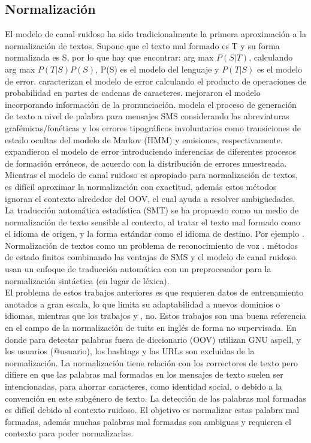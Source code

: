 \documentclass[spanish,12pt, a4paper,twoside]{paper}
\begin{document}
\subsection{Normalización}\label{sec:normalizacion}
El modelo de canal ruidoso \cite{shannon:1948} ha sido tradicionalmente la primera aproximación a la normalización de textos. Supone que el texto mal formado es T y su forma normalizada es S, por lo que hay que encontrar: arg max $P(S|T)$, calculando arg max $P(T|S) P(S)$, P(S) es el modelo del lenguaje y $P(T|S)$ es el modelo de error. \cite{brillmoore:2000} caracterizan el modelo de error calculando el producto de operaciones de probabilidad en partes de cadenas de caracteres. \cite{toutanovamoore:2002} mejoraron el modelo incorporando información de la pronunciación. \cite{choudhury:2007} modela el proceso de generación de texto a nivel de palabra para mensajes SMS considerando las abreviaturas grafémicas/fonéticas y los errores tipográficos involuntarios como transiciones de estado ocultas del modelo de Markov (HMM) y emisiones, respectivamente. \cite{cookstevenson:2009} expandieron el modelo de error introduciendo inferencias de diferentes procesos de formación erróneos, de acuerdo con la distribución de errores muestreada.\\

Mientras el modelo de canal ruidoso es apropiado para normalización de textos, es difícil aproximar la normalización con exactitud, además estos métodos ignoran el contexto alrededor del OOV, el cual ayuda a resolver ambigüedades. La traducción automática estadística (SMT) se ha propuesto como un medio de normalización de texto sensible al contexto, al tratar el texto mal formado como el idioma de origen, y la forma estándar como el idioma de destino. Por ejemplo \cite{aw:2006}. Normalización de textos como un problema de reconocimiento de voz \cite{kobus:2008}. \cite{beaufort:2002} métodos de estado finitos combinando las ventajas de SMS y el modelo de canal ruidoso. \cite{kaufmannkalita:2010} usan un enfoque de traducción automática con un preprocesador para la normalización sintáctica (en lugar de léxica).\\

El problema de estos trabajos anteriores es que requieren datos de entrenamiento anotados a gran escala, lo que limita su adaptabilidad a nuevos dominios o idiomas, mientras que los trabajos \cite{whitelaw:2009} y \cite{baldwin:2011}, no. Estos trabajos son una buena referencia en el campo de la normalización de tuits en inglés de forma no supervisada. En donde para detectar palabras fuera de diccionario (OOV) utilizan GNU aspell, y los usuarios (@usuario), los hashtags y las URLs son excluidas de la normalización. La normalización tiene relación con los correctores de texto \cite{peterson:1980} pero difiere en que las palabras mal formadas en los mensajes de texto suelen ser intencionadas, para ahorrar caracteres, como identidad social, o debido a la convención en este subgénero de texto. La detección de las palabras mal formadas es difícil debido al contexto ruidoso. El objetivo es normalizar estas palabra mal formadas, además muchas palabras mal formadas son ambiguas y requieren el contexto para poder normalizarlas.
\end{document}
